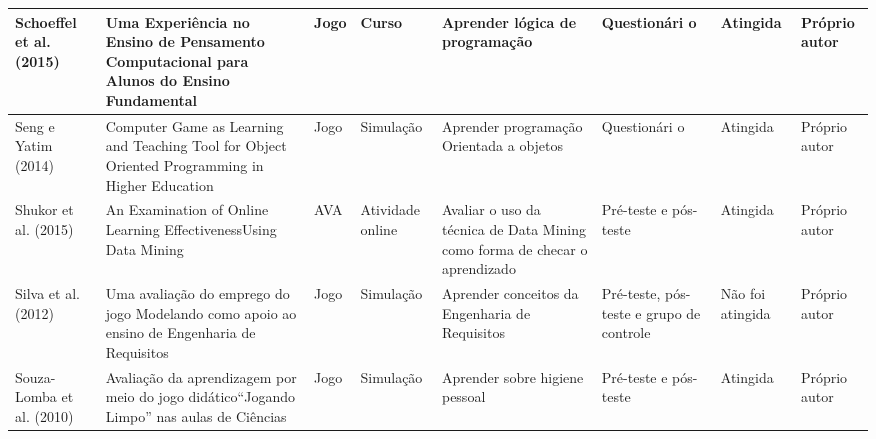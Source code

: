 \begin{table}
{\begin{tabular}{|L|m{5cm}|L|L|m{2.5cm}|m{2cm}|L|L|}
Schoeffel et al. (2015)        & Uma Experiência no Ensino de Pensamento Computacional para Alunos do Ensino Fundamental                                                                                                                & Jogo                  & Curso               & Aprender lógica de programação                                             & Questionári o                                                       & Atingida               & Próprio autor                                           \\ \hline
Seng e Yatim (2014)            & Computer Game as Learning and Teaching Tool for Object Oriented Programming in Higher Education                                                                                                        & Jogo                  & Simulação           & Aprender programação Orientada a objetos                                   & Questionári o                                                       & Atingida               & Próprio autor                                           \\ \hline
Shukor et al. (2015)           & An Examination of Online Learning EffectivenessUsing Data Mining                                                                                                                                       & AVA                   & Atividade online    & Avaliar o uso da técnica de Data Mining como forma de checar o aprendizado & Pré-teste e pós- teste                                              & Atingida               & Próprio autor                                           \\ \hline
Silva et al. (2012)            & Uma avaliação do emprego do jogo Modelando como apoio ao ensino de Engenharia de Requisitos                                                                                                            & Jogo                  & Simulação           & Aprender conceitos da Engenharia de Requisitos                             & Pré-teste, pós- teste e grupo de controle                           & Não foi atingida       & Próprio autor                                           \\ \hline
Souza- Lomba et al. (2010)     & Avaliação da aprendizagem por meio do jogo didático“Jogando Limpo” nas aulas de Ciências                                                                                                               & Jogo                  & Simulação           & Aprender sobre higiene pessoal                                             & Pré-teste e pós-teste                                               & Atingida               & Próprio autor                                           \\ \hline

\end{tabular}}
\end{table}
